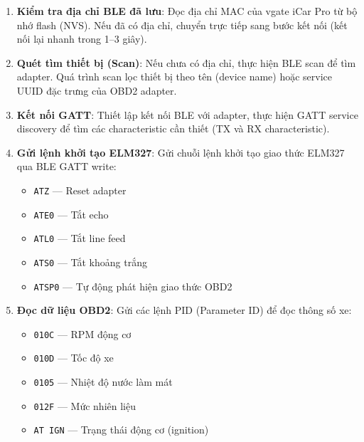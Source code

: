\documentclass[a4paper]{extarticle}
\providecommand{\tightlist}{%
  \setlength{\itemsep}{0pt}\setlength{\parskip}{0pt}}
\begin{document}
\begin{enumerate}
\def\labelenumi{\arabic{enumi}.}
\item
  \textbf{Kiểm tra địa chỉ BLE đã lưu}: Đọc địa chỉ MAC của vgate iCar
  Pro từ bộ nhớ flash (NVS). Nếu đã có địa chỉ, chuyển trực tiếp sang
  bước kết nối (kết nối lại nhanh trong 1--3 giây).
\item
  \textbf{Quét tìm thiết bị (Scan)}: Nếu chưa có địa chỉ, thực hiện BLE
  scan để tìm adapter. Quá trình scan lọc thiết bị theo tên (device
  name) hoặc service UUID đặc trưng của OBD2 adapter.
\item
  \textbf{Kết nối GATT}: Thiết lập kết nối BLE với adapter, thực hiện
  GATT service discovery để tìm các characteristic cần thiết (TX và RX
  characteristic).
\item
  \textbf{Gửi lệnh khởi tạo ELM327}: Gửi chuỗi lệnh khởi tạo giao thức
  ELM327 qua BLE GATT write:

  \begin{itemize}
  \tightlist
  \item
    \texttt{ATZ} --- Reset adapter
  \item
    \texttt{ATE0} --- Tắt echo
  \item
    \texttt{ATL0} --- Tắt line feed
  \item
    \texttt{ATS0} --- Tắt khoảng trắng
  \item
    \texttt{ATSP0} --- Tự động phát hiện giao thức OBD2
  \end{itemize}
\item
  \textbf{Đọc dữ liệu OBD2}: Gửi các lệnh PID (Parameter ID) để đọc
  thông số xe:

  \begin{itemize}
  \tightlist
  \item
    \texttt{010C} --- RPM động cơ
  \item
    \texttt{010D} --- Tốc độ xe
  \item
    \texttt{0105} --- Nhiệt độ nước làm mát
  \item
    \texttt{012F} --- Mức nhiên liệu
  \item
    \texttt{AT\ IGN} --- Trạng thái động cơ (ignition)
  \end{itemize}
\end{enumerate}
\end{document}
